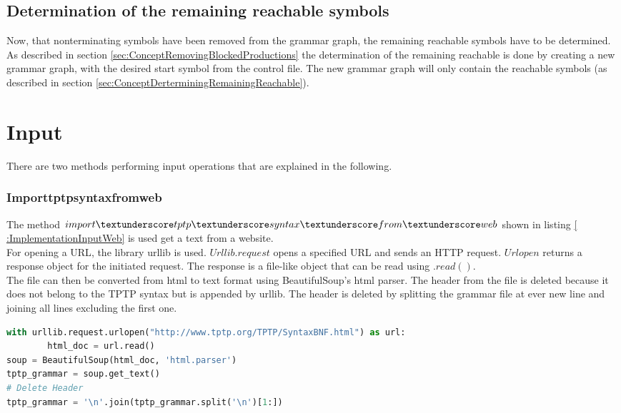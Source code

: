 \subsection{Determination of the remaining reachable symbols}
Now, that nonterminating symbols have been removed from the grammar graph, the remaining reachable symbols have to be determined.
As described in section \ref{sec:ConceptRemovingBlockedProductions} the determination of the remaining reachable is done by creating a new grammar graph, with the desired start symbol from the control file.
The new grammar graph will only contain the reachable symbols (as described in section \ref{sec:ConceptDerterminingRemainingReachable}). 

\section{Input}\label{sec:ImplementationInput}

There are two methods performing input operations that are explained in the following. 

\subsubsection{Import\textunderscore tptp\textunderscore syntax\textunderscore from\textunderscore web}
The method $import\textunderscore tptp\textunderscore syntax\textunderscore from\textunderscore web$ shown in listing \ref{
:ImplementationInputWeb} is used get a text from a website. \\
For opening a \ac{URL}, the library urllib is used. $Urllib.request$ opens a specified \ac{URL} and sends an HTTP request. $Urlopen$ returns a response object for the initiated request. The response is a file-like object that can be read using $.read()$. \cite{urllib} \\
The file can then be converted from html to text format using BeautifulSoup's html parser.
The header from the file is deleted because it does not belong to the \ac{TPTP} syntax but is appended by urllib. The header is deleted by splitting the grammar file at ever new line and joining all lines excluding the first one. \\

\begin{lstlisting}[language=Python, basicstyle=\scriptsize	,caption= Import TPTP syntax from web,label= lst:ImplementationInputWeb]
with urllib.request.urlopen("http://www.tptp.org/TPTP/SyntaxBNF.html") as url:
        html_doc = url.read()
soup = BeautifulSoup(html_doc, 'html.parser')
tptp_grammar = soup.get_text()
# Delete Header
tptp_grammar = '\n'.join(tptp_grammar.split('\n')[1:])
\end{lstlisting}

